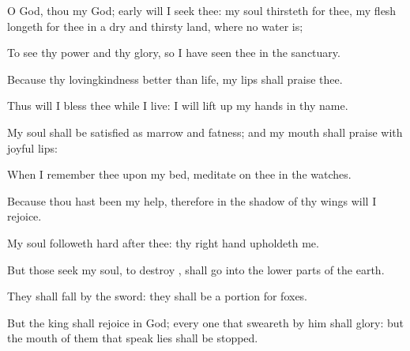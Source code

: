 {\Q {}O
God, thou
{} my
God; early will I
seek thee: my
soul
thirsteth for thee, my
flesh
longeth for thee in a
dry and
thirsty
land, where
no
water is;


\par }{\Q {}To
see thy
power and thy
glory, so
{} I have
seen thee in the
sanctuary.


\par }{\BB \par }
{\Q {}Because thy
lovingkindness
{}
better than
life, my
lips shall
praise thee.


\par }{\Q {}Thus will I
bless thee while I
live: I will lift
up my
hands in thy
name.


\par }{\Q {}My
soul shall be
satisfied as
{}
marrow and
fatness; and my
mouth shall
praise
{} with
joyful
lips:


\par }{\Q {}When I
remember thee upon my
bed,
{}
meditate on thee in the
{}
watches.


\par }{\BB \par }
{\Q {}Because thou hast been my
help, therefore in the
shadow of thy
wings will I
rejoice.


\par }{\Q {}My
soul followeth
hard
after thee: thy right
hand
upholdeth me.


\par }{\Q {}But those
{}
seek my
soul, to
destroy
{}, shall
go into the lower
parts of the
earth.


\par }{\Q {}They shall
fall by the
sword: they shall be a
portion for
foxes.


\par }{\Q {}But the
king shall
rejoice in
God; every one that
sweareth by him shall
glory: but the
mouth of them that
speak
lies shall be
stopped.




\par }
